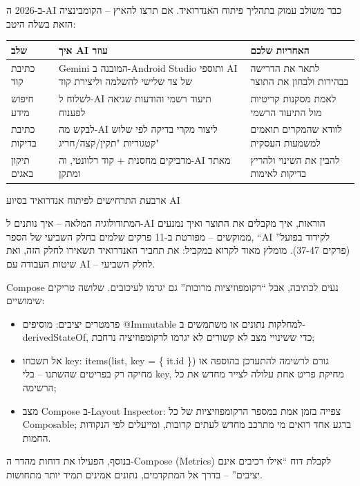 
ב-2026 ה-AI כבר משולב עמוק בתהליך פיתוח האנדרואיד. אם תרצו להאיץ – הקומבינציה הזאת בשלה היטב:

\begin{center}
\begin{tabularx}{\linewidth}{|X|X|X|}
\hline
\textbf{שלב} & \textbf{איך AI עוזר} & \textbf{האחריות שלכם} \tabularnewline
\hline
כתיבת קוד & ‏Gemini המובנה ב-Android Studio ותוספי AI של צד שלישי להשלמה וליצירת קוד & לתאר את הדרישה בבהירות ולבחון את התוצר \tabularnewline
חיפוש מידע & לשלוח ל-AI תיעוד רשמי והודעות שגיאה לפענוח & לאמת מסקנות קריטיות מול התיעוד הרשמי \tabularnewline
כתיבת בדיקות & לבקש מה-AI ליצור מקרי בדיקה לפי שלוש קטגוריות "תקין/קצה/חריג" & לוודא שהמקרים תואמים למשמעות העסקית \tabularnewline
תיקון באגים & מדביקים מחסנית + קוד רלוונטי, וה-AI מאתר ומתקן & להבין את השינוי ולהריץ בדיקות לאימות \tabularnewline
\hline
\end{tabularx}
\end{center}

\begin{center}\small\color{gray}ארבעת התרחישים לפיתוח אנדרואיד בסיוע AI\end{center}

המתודולוגיה המלאה – איך נותנים ל-AI הוראות, איך מקבלים את התוצר ואיך נמנעים ממוקשים – מפורטת ב-11 פרקים שלמים בחלק השביעי של הספר, “AI לקידוד בפועל” (פרקים 37-47). מומלץ מאוד לקרוא במקביל: את תחביר האנדרואיד תשאירו לחלק הזה, ואת שיטות העבודה עם AI – לחלק השביעי.


‏Compose נעים לכתיבה, אבל “רקומפוזיציות מרובות” גם יגרמו לעיכובים. שלושה טריקים שימושיים:

\begin{itemize}
  \item פרמטרים יציבים: מוסיפים @Immutable למחלקות נתונים או משתמשים ב-derivedStateOf, כדי ששינויי מצב לא קשורים לא יגרמו לרקומפוזיציה נרחבת;
  \item אל תשכחו key: ‏items(list, key = \{ it.id \}) גורם לרשימה להתעדכן בהוספה או מחיקה רק בפריטים שהשתנו – בלי key, מחיקת פריט אחת עלולה לצייר מחדש את כל הרשימה;
  \item מצב Compose ב-Layout Inspector: צפייה בזמן אמת במספר הרקומפוזיציות של כל Composable; ברגע אחד רואים מי מתרכב מחדש לעתים קרובות, ומייעלים לפי הנקודות החמות.
\end{itemize}

בנוסף, הפעילו את דוחות מהדר ה-Compose (Metrics) לקבלת דוח “אילו רכיבים אינם יציבים” – בדרך אל המתקדמים, נתונים אמינים תמיד יותר מתחושות.

